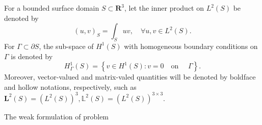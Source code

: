 \documentclass[11pt]{amsart}
\numberwithin{figure}{section}
\theoremstyle{plain}
\theoremstyle{definition}
\numberwithin{equation}{section}
\begin{document}
For a bounded surface domain $S \subset \mathbf{R}^{3} $, let the inner product on $L^{2} (S)$ be denoted by 
\[
  (u,v)_{S} = \int_{S} uv,\quad \forall u, v \in L^{2} (S).
\] 
For $\Gamma \subset \partial S$, the sub-space of $H^{1} (S)$ with homogeneous boundary conditions on $\Gamma$ is denoted by
\[
H^{1} _{\Gamma} (S) = \left\{ v \in H^{1} (S): v = 0 \quad \text{on } \quad \Gamma\right\}.
\] 
Moreover, vector-valued and matrix-valed quantities will be denoted by boldface and hollow notations, respectively, such as $\bm{L}^{2} (S) = \left(L^{2} (S)\right)^{3}, \mathbb{L}^{2} (S) = \left(L^{2} (S)\right) ^{3 \times 3} $.

The weak formulation of problem 
\end{document}
